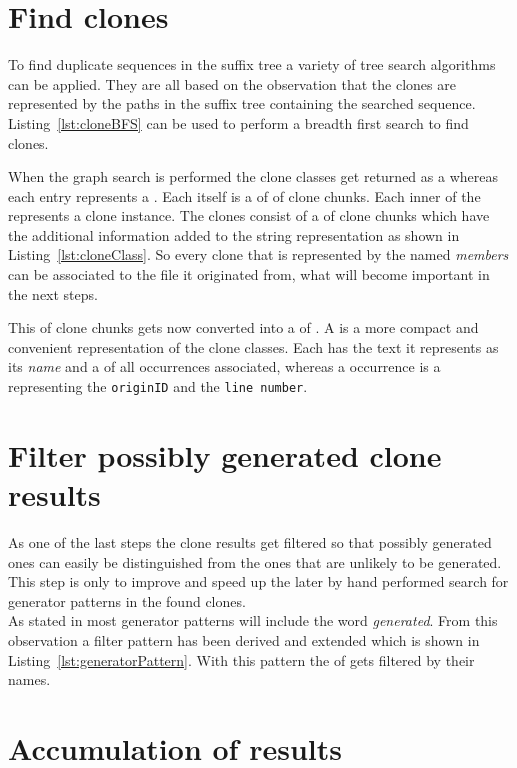 \section{Find clones}
To find duplicate sequences in the suffix tree a variety of tree search algorithms can be applied. They are all based on the observation that the clones are represented by the paths in the suffix tree containing the searched sequence. Listing~\ref{lst:cloneBFS} can be used to perform a breadth first search to find clones.

When the graph search is performed the clone classes get returned as a  whereas each entry represents a . Each  itself is a  of  of clone chunks. Each inner  of the  represents a clone instance. The clones consist of a  of clone chunks which have the additional information added to the string representation as shown in Listing~\ref{lst:cloneClass}. So every clone that is represented by the  named \textit{members} can be associated to the file it originated from, what will become important in the next steps.

This  of clone chunks gets now converted into a  of . A  is a more compact and convenient representation of the clone classes. Each has the text it represents as its \textit{name} and a  of all occurrences associated, whereas a occurrence is a  representing the \texttt{originID} and the \texttt{line number}. 


\section{Filter possibly generated clone results}
As one of the last steps the clone results get filtered so that possibly generated ones can easily be distinguished from the ones that are unlikely to be generated. This step is only to improve and speed up the later by hand performed search for generator patterns in the found clones.\\
As stated in \cite{Bernwieser2014} most generator patterns will include the word \textit{generated}. From this observation a filter pattern has been derived and extended which is shown in Listing~\ref{lst:generatorPattern}. With this pattern the  of  gets filtered by their names.


\section{Accumulation of results}

